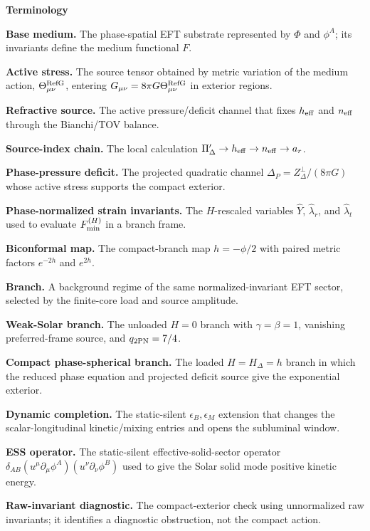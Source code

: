 \documentclass[12pt,a4paper]{article}
\begin{document}
\noindent\textbf{Terminology}\par\smallskip
\begin{list}{}{\setlength{\leftmargin}{0pt}\setlength{\itemindent}{0pt}\setlength{\labelwidth}{0pt}\setlength{\labelsep}{0pt}\setlength{\itemsep}{0pt}\setlength{\parsep}{0pt}\setlength{\parskip}{0pt}\setlength{\topsep}{0pt}\setlength{\partopsep}{0pt}}
\item \textbf{Base medium.} The phase-spatial EFT substrate represented by $\Phi$ and $\phi^A$; its invariants define the medium functional $F$.
\item \textbf{Active stress.} The source tensor obtained by metric variation of the medium action, $\Theta_{\mu\nu}^{\rm RefG}$, entering $G_{\mu\nu}=8\pi G\Theta_{\mu\nu}^{\rm RefG}$ in exterior regions.
\item \textbf{Refractive source.} The active pressure/deficit channel that fixes $h_{\rm eff}$ and $n_{\rm eff}$ through the Bianchi/TOV balance.
\item \textbf{Source-index chain.} The local calculation $\Pi_\Delta'\to h_{\rm eff}\to n_{\rm eff}\to a_r$.
\item \textbf{Phase-pressure deficit.} The projected quadratic channel $\Delta_P=Z_\Delta^\perp/(8\pi G)$ whose active stress supports the compact exterior.
\item \textbf{Phase-normalized strain invariants.} The $H$-rescaled variables $\widehat Y$, $\widehat\lambda_r$, and $\widehat\lambda_t$ used to evaluate $F_{\rm min}^{(H)}$ in a branch frame.
\item \textbf{Biconformal map.} The compact-branch map $h=-\phi/2$ with paired metric factors $e^{-2h}$ and $e^{2h}$.
\item \textbf{Branch.} A background regime of the same normalized-invariant EFT sector, selected by the finite-core load and source amplitude.
\item \textbf{Weak-Solar branch.} The unloaded $H=0$ branch with $\gamma=\beta=1$, vanishing preferred-frame source, and $q_{2{\rm PN}}=7/4$.
\item \textbf{Compact phase-spherical branch.} The loaded $H=H_\Delta=h$ branch in which the reduced phase equation and projected deficit source give the exponential exterior.
\item \textbf{Dynamic completion.} The static-silent $\epsilon_B,\epsilon_M$ extension that changes the scalar-longitudinal kinetic/mixing entries and opens the subluminal window.
\item \textbf{ESS operator.} The static-silent effective-solid-sector operator $\delta_{AB}(u^\mu\partial_\mu\phi^A)(u^\nu\partial_\nu\phi^B)$ used to give the Solar solid mode positive kinetic energy.
\item \textbf{Raw-invariant diagnostic.} The compact-exterior check using unnormalized raw invariants; it identifies a diagnostic obstruction, not the compact action.
\end{list}
\end{document}
